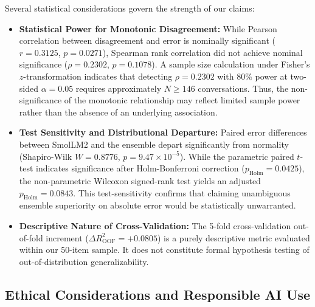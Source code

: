 Several statistical considerations govern the strength of our claims:
\begin{itemize}
    \item \textbf{Statistical Power for Monotonic Disagreement:} While Pearson correlation between disagreement and error is nominally significant ($r=0.3125$, $p=0.0271$), Spearman rank correlation did not achieve nominal significance ($\rho=0.2302$, $p=0.1078$). A sample size calculation under Fisher's $z$-transformation indicates that detecting $\rho=0.2302$ with $80\%$ power at two-sided $\alpha=0.05$ requires approximately $N \ge 146$ conversations. Thus, the non-significance of the monotonic relationship may reflect limited sample power rather than the absence of an underlying association.
    \item \textbf{Test Sensitivity and Distributional Departure:} Paired error differences between SmolLM2 and the ensemble depart significantly from normality (Shapiro-Wilk $W=0.8776$, $p=9.47\times 10^{-5}$). While the parametric paired $t$-test indicates significance after Holm-Bonferroni correction ($p_{\text{Holm}}=0.0425$), the non-parametric Wilcoxon signed-rank test yields an adjusted $p_{\text{Holm}}=0.0843$. This test-sensitivity confirms that claiming unambiguous ensemble superiority on absolute error would be statistically unwarranted.
    \item \textbf{Descriptive Nature of Cross-Validation:} The 5-fold cross-validation out-of-fold increment ($\Delta R^2_{\text{OOF}}=+0.0805$) is a purely descriptive metric evaluated within our 50-item sample. It does not constitute formal hypothesis testing of out-of-distribution generalizability.
\end{itemize}

\subsection{Ethical Considerations and Responsible AI Use}
\label{subsec:lim_ethics}

